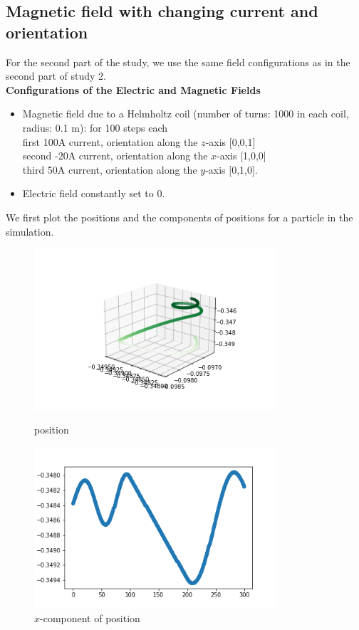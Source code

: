 \documentclass[12pt]{article}
\begin{document}
	\subsection{Magnetic field with changing current and orientation}
	For the second part of the study, we use the same field configurations as in the second part of study 2. \\
	\noindent \textbf{Configurations of the Electric and Magnetic Fields}
	\begin{itemize}
		\item Magnetic field due to a Helmholtz coil (number of turns: 1000 in each coil, radius: 0.1 m): for 100  steps each \\ 
		first 100A current, orientation along
		the $z$-axis [0,0,1] \\
		second -20A current, orientation along the $x$-axis [1,0,0] \\
		third 50A current,
		orientation along the $y$-axis [0,1,0].
		\item Electric field constantly set to 0.
	\end{itemize}
	\noindent We first plot the positions and the components of positions for a particle in the simulation.
	\begin{figure}[H]
		\begin{multicols}{2}
			\includegraphics[width=\linewidth, height=6cm]{ps3.png} \caption{position} \label{ps3} \par
			\includegraphics[width=\linewidth, height=6cm]{psx3.png} \caption{$x$-component of position} \label{psx3} \par
		\end{multicols}
	\end{figure}
\end{document}
